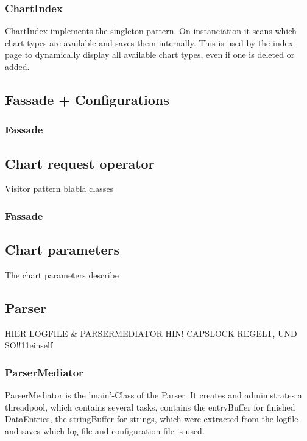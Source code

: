 \subsubsection*{ChartIndex}
ChartIndex implements the singleton pattern. On instanciation it scans which chart types are available 
and saves them internally. This is used by the index page to dynamically display all available chart types,
even if one is deleted or added.

\subsection{Fassade + Configurations}
\subsubsection{Fassade}


\subsection{Chart request operator}
Visitor pattern blabla
classes
\subsubsection{Fassade}

\subsection{Chart parameters}
The chart parameters describe 

\subsection{}


\subsection{Parser}

HIER LOGFILE \& PARSERMEDIATOR HIN!
CAPSLOCK REGELT, UND SO!!11einself

\subsubsection*{ParserMediator}
ParserMediator is the 'main'-Class of the Parser. It creates and administrates a threadpool, which contains several tasks, 
contains the entryBuffer for finished DataEntries, the stringBuffer for strings, which were extracted
from the logfile and saves which log file and configuration file is used.

